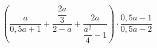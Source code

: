 \begin{ex}[type=expression]
	\begin{condition}
		\( \left( \dfrac{a}{0,5a+1} +\dfrac{\dfrac{2a}{3}}{2-a}+\dfrac{2a}{\dfrac{a^2}{4}-1}\right)\cdot\dfrac{0,5a-1}{0,5a-2} \)
	\end{condition}
\end{ex}